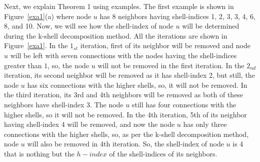 \documentclass[12pt,3p]{article}
\begin{document}
Next, we explain Theorem 1 using examples. The first example is shown in Figure~\ref{exa1}(a) where node $u$ has 8 neighbors having shell-indices 1, 2, 3, 3, 4, 6, 8, and 10. Now, we will see how the shell-index of node $u$ will be determined during the k-shell decomposition method. All the iterations are shown in Figure~\ref{exa1}. In the $1_{st}$ iteration, first of its neighbor will be removed and node $u$ will be left with seven connections with the nodes having the shell-indices greater than $1$, so, the node $u$ will not be removed in the first iteration. In the $2_{nd}$ iteration, its second neighbor will be removed as it has shell-index 2, but still, the node $u$ has six connections with the higher shells, so, it will not be removed. In the third iteration, its 3rd and 4th neighbors will be removed as both of these neighbors have shell-index 3. The node $u$ still has four connections with the higher shells, so it will not be removed. In the 4th iteration, 5th of its neighbor having shell-index 4 will be removed, and now the node $u$ has only three connections with the higher shells, so, as per the k-shell decomposition method, node $u$ will also be removed in 4th iteration. So, the shell-index of node $u$ is 4 that is nothing but the $h-index$ of the shell-indices of its neighbors.


\end{document}
